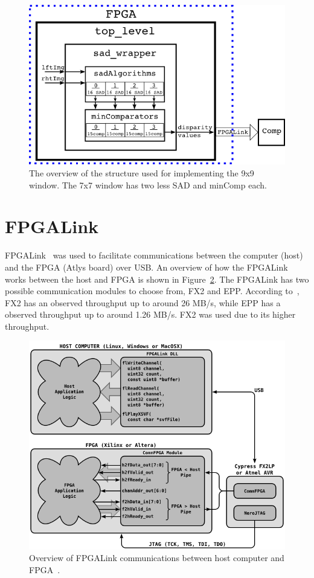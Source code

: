\begin{figure}
	\begin{center}
		\includegraphics[width=150mm]{figures/top_level_rtl.png}
		\captionfonts
		\caption{The overview of the structure used for implementing the 9x9 window. The 7x7 window has two less SAD and minComp each.}
		\label{fig:topLevel_rtl}
	\end{center}
\end{figure}

\section{FPGALink}
\label{sec:fpgalink}

FPGALink~\cite{fpgalink} was used to facilitate communications between the computer (host) and the FPGA (Atlys board) over USB. An overview of how the FPGALink works between the host and FPGA is shown in Figure~\ref{fig:fpgalink}. The FPGALink has two possible communication modules to choose from, FX2 and EPP. According to~\cite{fpgalink}, FX2 has an observed throughput up to around 26 MB/s, while EPP has a observed throughput up to around 1.26 MB/s. FX2 was used due to its higher throughput.

\begin{figure}
	\begin{center}
		\includegraphics[width=150mm]{figures/fpgalinkOverview.png}
		\captionfonts
		\caption{Overview of FPGALink communications between host computer and FPGA~\cite{fpgalink}.}
		\label{fig:fpgalink}
	\end{center}
\end{figure}

